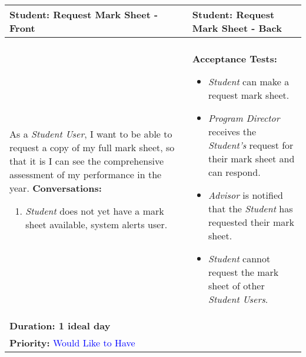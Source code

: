 \documentclass[11pt]{article}
\begin{document}
\begin{center}
\begin{tabular}{ | m{8cm}  |  m{8cm}  | } 
 \hline
 \textbf{Student: Request Mark Sheet - Front} &  \textbf{Student: Request Mark Sheet - Back}  \\ 
  \hline
&\\[5pt]
As a \emph{Student User}, I want to be able to request a copy of my full mark sheet, so that it is I can see the comprehensive assessment of my performance in the year.
\newline
\textbf{Conversations:}
\begin{enumerate}
\item{\emph{Student} does not yet have a mark sheet available, system alerts user.}
\end{enumerate}
& \textbf{Acceptance Tests:} 
\begin{itemize}
\item{\emph{Student} can make a request mark sheet.}
\item{\emph{Program Director} receives the \emph{Student's} request for their mark sheet and can respond.}
\item{\emph{Advisor} is notified that the \emph{Student} has requested their mark sheet.}
\item{\emph{Student} cannot  request the mark sheet of other \emph{Student Users}.} 
\end{itemize} \\
\textbf{Duration: 1 ideal day} &\\
\textbf{Priority:}  \textcolor{blue}{Would Like to Have} & \\
 \hline
\end{tabular}
\end{center}
\end{document}
